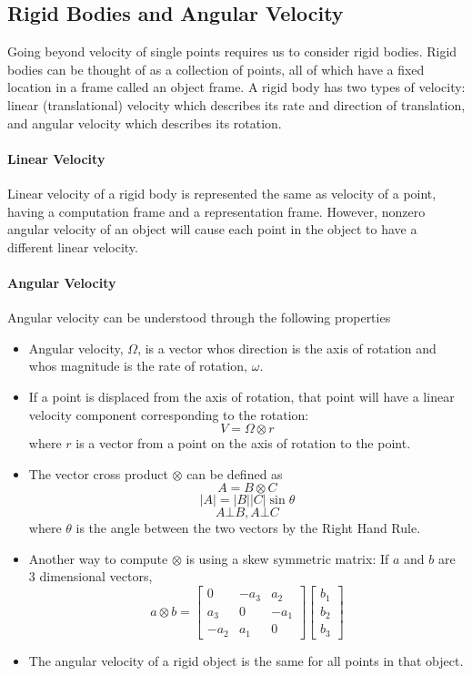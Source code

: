 \subsection{Rigid Bodies and Angular Velocity}\label{sectionrigidbodies}

Going beyond velocity of single points requires us to consider rigid bodies.
Rigid bodies can be thought of as a collection of points, all of which have a fixed location in a frame called an object frame.   A rigid body has two types of velocity: linear (translational) velocity which describes its rate and direction of translation, and angular velocity which describes its rotation.

\paragraph{Linear Velocity}  Linear velocity of a rigid body is represented the same as velocity of a point, having a computation frame and a representation frame.   However, nonzero angular velocity of an object will cause each point in the object to have a different linear velocity.

\paragraph{Angular Velocity}
Angular velocity can be   understood through the following properties
\begin{itemize}
  \item Angular velocity, $\Omega$, is a vector whos direction is the axis
  of rotation and whos magnitude is the rate of rotation, $\omega$.

  \item If a point is displaced from the axis of rotation, that point will
  have a linear velocity component corresponding to the rotation:
  \[
    V = \Omega \otimes r
  \]
  where $r$ is a vector from a point on the axis of rotation to the point.

  \item The vector cross product $\otimes$ can be defined as
  \[
  A = B \otimes C
  \]
  \[
  |A| = |B||C|\sin\theta
  \]
  \[
  A \bot B,  A\bot C
  \]
  where $\theta$ is the angle between the two vectors
  by the Right Hand Rule.

  \item Another way to compute $\otimes$ is using a skew symmetric matrix:
If $a$ and $b$ are 3 dimensional vectors,
\[
a \otimes b = \left[ \begin{array}{ccc}
0 & -a_3 & a_2 \\
a_3 & 0 & -a_1 \\
-a_2 & a_1 & 0
\end{array} \right]
\left[ \begin{array}{c}
b_1 \\
b_2 \\
b_3
\end{array} \right]
\]

  \item The angular velocity of a rigid object is the same for all
  points in that object.

\end{itemize}




